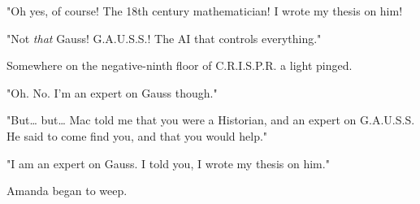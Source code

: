 \documentclass[12pt]{article}
\begin{document}
"Oh yes, of course! The 18th century mathematician! I wrote my thesis on him!

"Not \emph{that} Gauss! G.A.U.S.S.! The AI that controls everything."

Somewhere on the negative-ninth floor of C.R.I.S.P.R. a light pinged.

"Oh. No. I'm an expert on Gauss though."

"But\ldots{} but\ldots{} Mac told me that you were a Historian, and an expert on G.A.U.S.S. He said to come find you, and that you would help."

"I am an expert on Gauss. I told you, I wrote my thesis on him."

Amanda began to weep.
\end{document}
